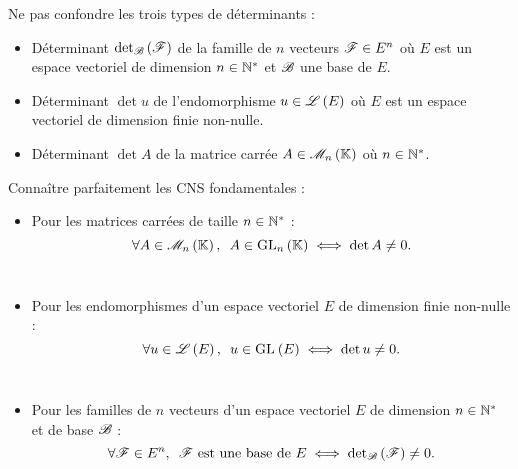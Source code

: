 Ne pas confondre les trois types de déterminants :

\begin{itemize}
    \item Déterminant \(\detb\paren{\fami{F}}\) de la famille de \(n\) vecteurs \(\mathscr{F}\in E^n\) où \(E\) est un espace vectoriel de dimension \(n\in\mathbb{N}^*\) et \(\mathscr{B}\) une base de \(E\). \\
    \item Déterminant \(\det u\) de l'endomorphisme \(u\in\mathscr{L}\left(E\right)\) où \(E\) est un espace vectoriel de dimension finie non-nulle. \\
    \item Déterminant \(\det A\) de la matrice carrée \(A\in\M{n}\) où \(n\in\mathbb{N}^*\).
\end{itemize}

Connaître parfaitement les CNS fondamentales :

\begin{itemize}
    \item Pour les matrices carrées de taille \(n\in\mathbb{N}^*\) : \[\quantifs{\forall A\in\M{n}}A\in\GL{n}\ssi\det A\not=0.\]~
    \item Pour les endomorphismes d'un espace vectoriel \(E\) de dimension finie non-nulle : \[\quantifs{\forall u\in\Lendo{E}}u\in\GL{}[E]\ssi\det u\not=0.\]~
    \item Pour les familles de \(n\) vecteurs d'un espace vectoriel \(E\) de dimension \(n\in\mathbb{N}^*\) et de base \(\mathscr{B}\) : \[\quantifs{\forall\fami{F}\in E^n}\fami{F}\text{ est une base de }E\ssi\detb\paren{\fami{F}}\not=0.\]
\end{itemize}